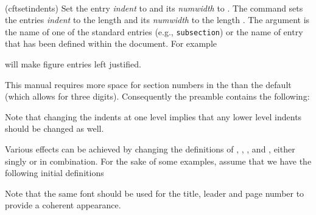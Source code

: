 \begin{syntax}
\cmd{\cftsetindents} \\
\end{syntax}
\glossary(cftsetindents)%
  {}%
  {Set the  entry \textit{indent} to  and
   its \textit{numwidth} to .}
 The command 
 \cmd{\cftsetindents} sets the  entries \textit{indent} to the 
length  and its
 \textit{numwidth} to the length . The  argument
 is the name of one of the standard entries (e.g., \texttt{subsection}) or the 
name of entry that has been defined within the document.
 For example 
\begin{lcode}
\end{lcode}
 will make figure entries left justified.

    This manual requires more space for section numbers in the \toc{} than
the default (which allows for three digits). Consequently the preamble
contains the following:
\begin{lcode}
\end{lcode}
Note that changing the indents at one level implies that any lower level
indents should be changed as well.


 Various effects can be achieved by changing the definitions of \cmd{\cftKfont},
 \cmd{\cftKaftersnum}, \cmd{\cftKaftersnumb}, \cmd{\cftKleader} and 
\cmd{\cftKafterpnum}, 
 either singly or in combination.
 For the sake of some examples, assume that we have the following initial
 definitions
 \begin{lcode}
 \newcommand*{\cftKfont}{}
 \newcommand*{\cftKaftersnum}{}
 \newcommand*{\cftKaftersnumb}{}
 \newcommand*{\cftKleader}{\cftdotfill{\cftKdotsep}}
 \newcommand*{\cftKdotsep}{\cftdotsep}
 \newcommand*{\cftKpagefont}{}
 \newcommand*{\cftKafterpnum}{}
 \end{lcode}
Note that the same font should be used for the title, leader and page 
 number to provide a coherent appearance.

